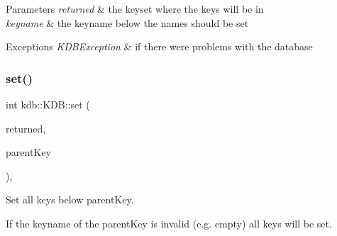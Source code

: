 \begin{DoxyParams}{Parameters}
{\em returned} & the keyset where the keys will be in \\
\hline
{\em keyname} & the keyname below the names should be set\\
\hline
\end{DoxyParams}

\begin{DoxyExceptions}{Exceptions}
{\em K\+D\+B\+Exception} & if there were problems with the database \\
\hline
\end{DoxyExceptions}
\mbox{\label{classkdb_1_1KDB_a62a4fafbe21d9519b31a7868aa05f3e3}} 
\subsubsection{\texorpdfstring{set()}{set()}\hspace{0.1cm}{\footnotesize\ttfamily [2/2]}}
{\footnotesize\ttfamily int kdb\+::\+K\+D\+B\+::set (\begin{DoxyParamCaption}\item[{\mbox{\hyperlink{classkdb_1_1KeySet}{Key\+Set}} \&}]{returned,  }\item[{\mbox{\hyperlink{classkdb_1_1Key}{Key}} \&}]{parent\+Key }\end{DoxyParamCaption})\hspace{0.3cm}{\ttfamily [inline]}, {\ttfamily [virtual]}}



Set all keys below parent\+Key. 

If the keyname of the parent\+Key is invalid (e.\+g. empty) all keys will be set.

